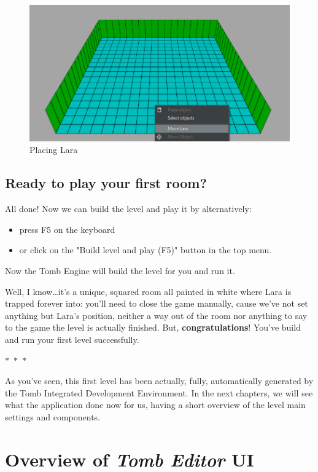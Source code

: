\begin{figure}
    \centering
     \includegraphics[width=1\textwidth]{screenshots/1001.png}
     \caption{Placing Lara}
     \label{fig:temovelara} 
\end{figure}

\section{Ready to play your first room?}
All done! Now we can build the level and play it by alternatively:
\begin{itemize}
    \item press F5 on the keyboard
    \item or click on the "Build level and play (F5)" button in the top menu.
\end{itemize}
Now the Tomb Engine will build the level for you and run it.
\par Well, I know\dots it's a unique, squared room all painted in white where Lara is trapped forever into: you'll need to close the game manually, cause we've not set anything but Lara's position, neither a way out of the room nor anything to say to the game the level is actually finished. But, \textbf{congratulations}! You've build and run your first level successfully.
\begin{center}
  $\ast$~$\ast$~$\ast$
\end{center}

\par As you've seen, this first level has been actually, fully, automatically generated by the Tomb Integrated Development Environment. In the next chapters, we will see what the application done now for us, having a short overview of the level main settings and components.

\chapter{Overview of \emph{Tomb Editor} UI}

